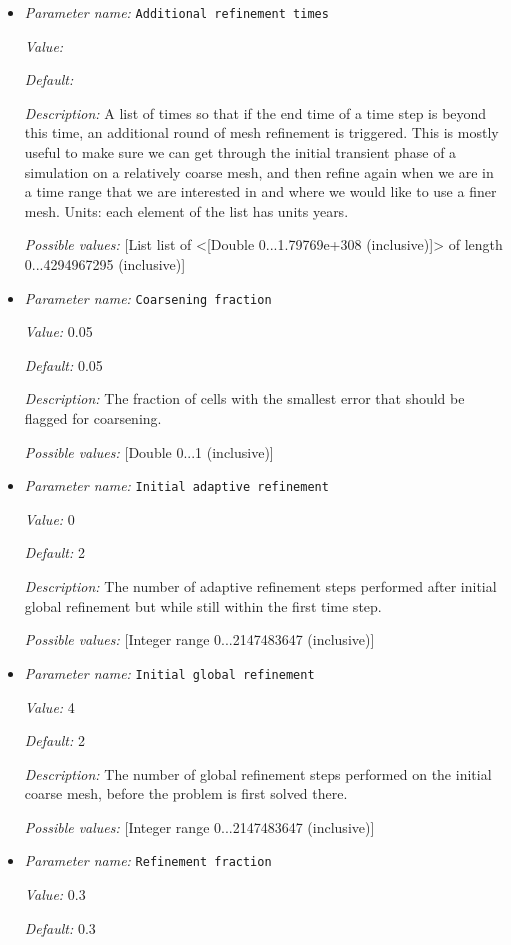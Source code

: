 \begin{itemize}
\item {\it Parameter name:} {\tt Additional refinement times}


{\it Value:} 


{\it Default:} 


{\it Description:} A list of times so that if the end time of a time step is beyond this time, an additional round of mesh refinement is triggered. This is mostly useful to make sure we can get through the initial transient phase of a simulation on a relatively coarse mesh, and then refine again when we are in a time range that we are interested in and where we would like to use a finer mesh. Units: each element of the list has units years.


{\it Possible values:} [List list of <[Double 0...1.79769e+308 (inclusive)]> of length 0...4294967295 (inclusive)]
\item {\it Parameter name:} {\tt Coarsening fraction}


{\it Value:} 0.05


{\it Default:} 0.05


{\it Description:} The fraction of cells with the smallest error that should be flagged for coarsening.


{\it Possible values:} [Double 0...1 (inclusive)]
\item {\it Parameter name:} {\tt Initial adaptive refinement}


{\it Value:} 0


{\it Default:} 2


{\it Description:} The number of adaptive refinement steps performed after initial global refinement but while still within the first time step.


{\it Possible values:} [Integer range 0...2147483647 (inclusive)]
\item {\it Parameter name:} {\tt Initial global refinement}


{\it Value:} 4


{\it Default:} 2


{\it Description:} The number of global refinement steps performed on the initial coarse mesh, before the problem is first solved there.


{\it Possible values:} [Integer range 0...2147483647 (inclusive)]
\item {\it Parameter name:} {\tt Refinement fraction}


{\it Value:} 0.3


{\it Default:} 0.3



\end{itemize}
